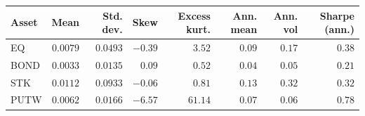 \begin{tabular}{lrrrrrrr}
\toprule
Asset & Mean & Std. dev. & Skew & Excess kurt. & Ann. mean & Ann. vol & Sharpe (ann.) \\
\midrule
EQ & $0.0079$ & $0.0493$ & $-0.39$ & $3.52$ & $0.09$ & $0.17$ & $0.38$ \\
BOND & $0.0033$ & $0.0135$ & $0.09$ & $0.52$ & $0.04$ & $0.05$ & $0.21$ \\
STK & $0.0112$ & $0.0933$ & $-0.06$ & $0.81$ & $0.13$ & $0.32$ & $0.32$ \\
PUTW & $0.0062$ & $0.0166$ & $-6.57$ & $61.14$ & $0.07$ & $0.06$ & $0.78$ \\
\bottomrule
\end{tabular}
